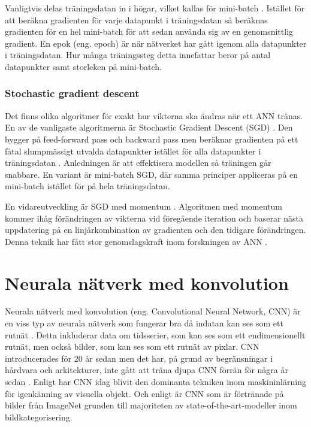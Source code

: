 \documentclass[]{kththesis}
\begin{document}
Vanligtvis delas träningsdatan in i högar, vilket kallas för mini-batch \parencite{Goodfellow-et-al-2016}. Istället för att beräkna gradienten för varje datapunkt i träningsdatan så beräknas gradienten för en hel mini-batch för att sedan använda sig av en genomsnittlig gradient. En epok (eng. epoch) är när nätverket har gått igenom alla datapunkter i träningsdatan. Hur många träningssteg detta innefattar beror på antal datapunkter samt storleken på mini-batch.

\subsubsection{Stochastic gradient descent}
Det finns olika algoritmer för exakt hur vikterna ska ändras när ett ANN tränas. En av de vanligaste algoritmerna är Stochastic Gradient Descent (SGD) \parencite{Goodfellow-et-al-2016}. Den bygger på feed-forward pass och backward pass men beräknar gradienten på ett fåtal slumpmässigt utvalda datapunkter istället för alla datapunkter i träningsdatan \parencite{bottou2010large}. Anledningen är att effektisera modellen så träningen går snabbare. En variant är mini-batch SGD, där samma principer appliceras på en mini-batch istället för på hela träningsdatan.

En vidareutveckling är SGD med momentum \parencite{qian1999momentum}. Algoritmen med momentum kommer ihåg förändringen av vikterna vid föregående iteration och baserar nästa uppdatering på en linjärkombination av gradienten och den tidigare förändringen. Denna teknik har fått stor genomslagskraft inom forskningen av ANN \parencite{sutskever2013importance}.

\section{Neurala nätverk med konvolution}
Neurala nätverk med konvolution (eng. Convolutional Neural Network, CNN) är en viss typ av neurala nätverk som fungerar bra då indatan kan ses som ett rutnät \parencite{Goodfellow-et-al-2016}. Detta inkluderar data om tidsserier, som kan ses som ett endimensionellt rutnät, men också bilder, som kan ses som ett rutnät av pixlar. CNN introducerades för 20 år sedan men det har, på grund av begränsningar i hårdvara och arkitekturer, inte gått att träna djupa CNN förrän för några år sedan \parencite{huang2017densely}. Enligt \textcite{huang2017densely} har CNN idag blivit den dominanta tekniken inom maskininlärning för igenkänning av visuella objekt. Och enligt \textcite{simon2016imagenet} är CNN som är förtränade på bilder från ImageNet grunden till majoriteten av state-of-the-art-modeller inom bildkategorisering.
\end{document}
